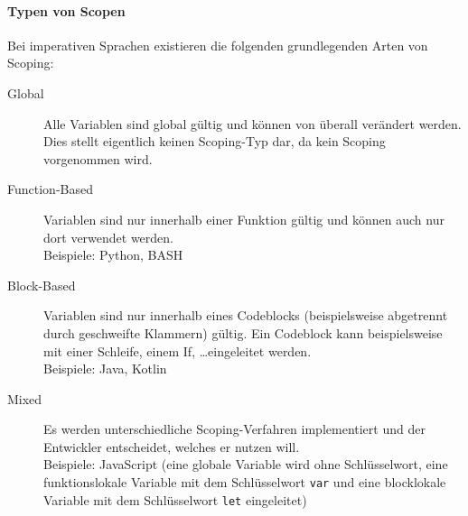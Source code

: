 \paragraph{Typen von Scopen}
	Bei imperativen Sprachen existieren die folgenden grundlegenden Arten von Scoping:
	\begin{description}
		\item[Global] Alle Variablen sind global gültig und können von überall verändert werden. \\ Dies stellt eigentlich keinen Scoping-Typ dar, da kein Scoping vorgenommen wird.
		\item[Function-Based] Variablen sind nur innerhalb einer Funktion gültig und können auch nur dort verwendet werden. \\ Beispiele: Python, BASH
		\item[Block-Based] Variablen sind nur innerhalb eines Codeblocks (beispielsweise abgetrennt durch geschweifte Klammern) gültig. Ein Codeblock kann beispielsweise mit einer Schleife, einem If, \dots eingeleitet werden. \\ Beispiele: Java, Kotlin
		\item[Mixed] Es werden unterschiedliche Scoping-Verfahren implementiert und der Entwickler entscheidet, welches er nutzen will. \\ Beispiele: JavaScript (eine globale Variable wird ohne Schlüsselwort, eine funktionslokale Variable mit dem Schlüsselwort \texttt{var} und eine blocklokale Variable mit dem Schlüsselwort \texttt{let} eingeleitet)
	\end{description}
